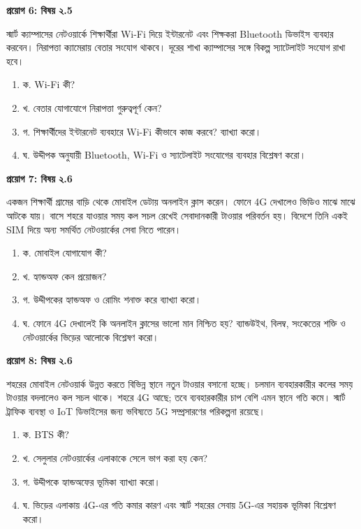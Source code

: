 \par{}
\textbf{প্রয়োগ 6: বিষয় ২.5}\par
স্মার্ট ক্যাম্পাসের নেটওয়ার্কে শিক্ষার্থীরা Wi-Fi দিয়ে ইন্টারনেট এবং শিক্ষকরা Bluetooth ডিভাইস ব্যবহার করবেন। নিরাপত্তা ক্যামেরায় বেতার সংযোগ থাকবে। দূরের শাখা ক্যাম্পাসের সঙ্গে বিকল্প স্যাটেলাইট সংযোগ রাখা হবে।

\begin{enumerate}
\item ক. Wi-Fi কী?
\item খ. বেতার যোগাযোগে নিরাপত্তা গুরুত্বপূর্ণ কেন?
\item গ. শিক্ষার্থীদের ইন্টারনেট ব্যবহারে Wi-Fi কীভাবে কাজ করবে? ব্যাখ্যা করো।
\item ঘ. উদ্দীপক অনুযায়ী Bluetooth, Wi-Fi ও স্যাটেলাইট সংযোগের ব্যবহার বিশ্লেষণ করো।
\end{enumerate}
\par

\par{}
\textbf{প্রয়োগ 7: বিষয় ২.6}\par
\par
একজন শিক্ষার্থী গ্রামের বাড়ি থেকে মোবাইল ডেটায় অনলাইন ক্লাস করেন। ফোনে 4G দেখালেও ভিডিও মাঝে মাঝে আটকে যায়। বাসে শহরে যাওয়ার সময় কল সচল রেখেই সেবাদানকারী টাওয়ার পরিবর্তন হয়। বিদেশে তিনি একই SIM দিয়ে অন্য সমর্থিত নেটওয়ার্কের সেবা নিতে পারেন।

\begin{enumerate}
\item ক. মোবাইল যোগাযোগ কী?
\item খ. হ্যান্ডঅফ কেন প্রয়োজন?
\item গ. উদ্দীপকের হ্যান্ডঅফ ও রোমিং শনাক্ত করে ব্যাখ্যা করো।
\item ঘ. ফোনে 4G দেখালেই কি অনলাইন ক্লাসের ভালো মান নিশ্চিত হয়? ব্যান্ডউইথ, বিলম্ব, সংকেতের শক্তি ও নেটওয়ার্কের ভিড়ের আলোকে বিশ্লেষণ করো।
\end{enumerate}
\par

\par{}
\textbf{প্রয়োগ 8: বিষয় ২.6}\par
শহরের মোবাইল নেটওয়ার্ক উন্নত করতে বিভিন্ন স্থানে নতুন টাওয়ার বসানো হচ্ছে। চলমান ব্যবহারকারীর কলের সময় টাওয়ার বদলালেও কল সচল থাকে। শহরে 4G আছে; তবে ব্যবহারকারীর চাপ বেশি এমন স্থানে গতি কমে। স্মার্ট ট্রাফিক ব্যবস্থা ও IoT ডিভাইসের জন্য ভবিষ্যতে 5G সম্প্রসারণের পরিকল্পনা রয়েছে।

\begin{enumerate}
\item ক. BTS কী?
\item খ. সেলুলার নেটওয়ার্কের এলাকাকে সেলে ভাগ করা হয় কেন?
\item গ. উদ্দীপকে হ্যান্ডঅফের ভূমিকা ব্যাখ্যা করো।
\item ঘ. ভিড়ের এলাকায় 4G-এর গতি কমার কারণ এবং স্মার্ট শহরের সেবায় 5G-এর সহায়ক ভূমিকা বিশ্লেষণ করো।
\end{enumerate}
\par


